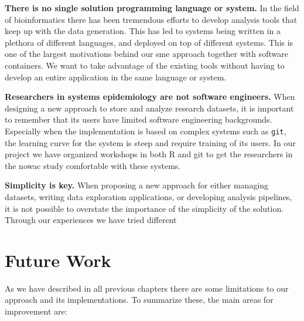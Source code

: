 \textbf{There is no single solution programming language or system.} In the
field of bioinformatics there has been tremendous efforts to develop analysis
tools that keep up with the data generation. This has led to systems being
written in a plethora of different languages, and deployed on top of different
systems.  This is one of the largest motivations behind our \gls{sme} approach
together with software containers. We want to take advantage of the existing
tools without having to develop an entire application in the same language or
system.

\textbf{Researchers in systems epidemiology are not software engineers.} When
designing a new approach to store and analyze research datasets, it is important
to remember that its users have limited software engineering backgrounds.
Especially when the implementation is based on complex systems such as
\texttt{git}, the learning curve for the system is steep and require training of
its users. In our project we have organized workshops in both R and git to get
the researchers in the \gls{nowac} study comfortable with these systems. 

\textbf{Simplicity is key.} When proposing a new approach for either managing
datasets, writing data exploration applications, or developing analysis
pipelines, it is not possible to overstate the importance of the simplicity of
the solution. Through our experiences we have tried different 




\section{Future Work}
As we have described in all previous chapters there are some limitations to our
approach and its implementations. To summarize these, the main areas for
improvement are: 

